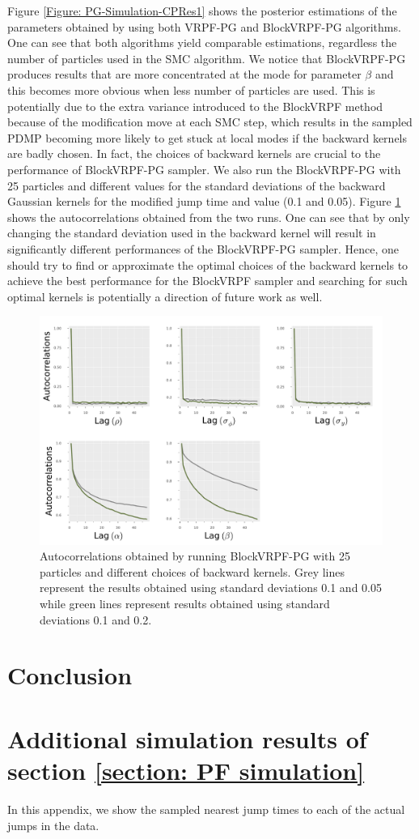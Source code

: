\documentclass[12pt,a4paper]{article}
\begin{document}
Figure \ref{Figure: PG-Simulation-CPRes1} shows the posterior estimations of the parameters obtained by using both VRPF-PG and BlockVRPF-PG algorithms. One can see that both algorithms yield comparable estimations, regardless the number of particles used in the SMC algorithm. We notice that BlockVRPF-PG produces results that are more concentrated  at the mode for parameter \(\beta\) and this becomes more obvious when less number of particles are used. This is potentially due to the extra variance introduced to the BlockVRPF method because of the modification move at each SMC step, which results in the sampled PDMP becoming more likely to get stuck at local modes if the backward kernels are badly chosen. In fact, the choices of backward kernels are crucial to the performance of BlockVRPF-PG sampler. We also run the BlockVRPF-PG with 25 particles and different values for the standard deviations of the backward Gaussian kernels for the modified jump time and value (0.1 and 0.05). Figure \ref{Figure: PG-Simulation-CPRes2} shows the autocorrelations obtained from the two runs. One can see that by only changing the standard deviation used in the backward kernel will result in significantly different performances of the BlockVRPF-PG sampler. Hence, one should try to find or approximate the optimal choices of the backward kernels to achieve the best performance for the BlockVRPF sampler and searching for such optimal kernels is potentially a direction of future work as well. 
\begin{figure}
    \centering
    \includegraphics[width=\textwidth]{PG-simulation-CPRes2.pdf}
    \caption{Autocorrelations obtained by running BlockVRPF-PG with 25 particles and different choices of backward kernels. Grey lines represent the results obtained using standard deviations 0.1 and 0.05 while green lines represent results obtained using standard deviations 0.1 and 0.2.}
    \label{Figure: PG-Simulation-CPRes2}
\end{figure}
\section{Conclusion}
\newpage


\newpage
\appendix
\section{Additional simulation results of section \ref{section: PF simulation}}
In this appendix, we show the sampled nearest jump times to each of the actual jumps in the data. 
\end{document}

